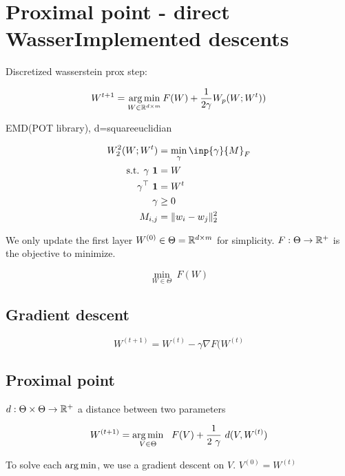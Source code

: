\section{Proximal point - direct WasserImplemented descents}

Discretized wasserstein prox step:

\begin{equation}
	W^{t+1} = \operatorname*{arg\,min}_{W \in \mathbb{R}^{d \times m}} F(W) + \frac{1}{2 \gamma} W_p(W; W^t))
\end{equation}


EMD(POT library), d=squareeuclidian

\begin{align}
	W_2^2(W; W^t) &= \min_{\gamma} \inp{\gamma}{M}_F \\
	\text{s.t.  } \gamma ~ \mathbf{1} &= W \\
	\gamma^\top ~ \mathbf{1} &= W^t \\
	\gamma &\geq 0 \\
	M_{i, j} &= \lVert w_i - w_j \rVert^2_2
\end{align}

We only update the first layer $W^{(0)} \in \Theta = \mathbb{R}^{d \times m}$ for simplicity. $F : \Theta \rightarrow \mathbb{R}^+$ is the objective to minimize.

\begin{equation}
	\min_{W \in \Theta} \ F(W)
\end{equation}

\subsection{Gradient descent}

\begin{equation}
	W^{(t+1)} = W^{(t)} - \gamma \nabla F(W^{(t)}
\end{equation}

\subsection{Proximal point}

$d: \Theta \times \Theta \rightarrow \mathbb{R}^+$ a distance between two parameters

\begin{equation}
	W^{(t+1)} = \argmin_{V \in \Theta} \ \  F(V) + \frac{1}{2 ~ \gamma} ~ d(V, W^{(t)})
\end{equation}

To solve each $\operatorname*{arg\,min}$, we use a gradient descent on $V$. $V^{(0)} = W^{(t)}$

